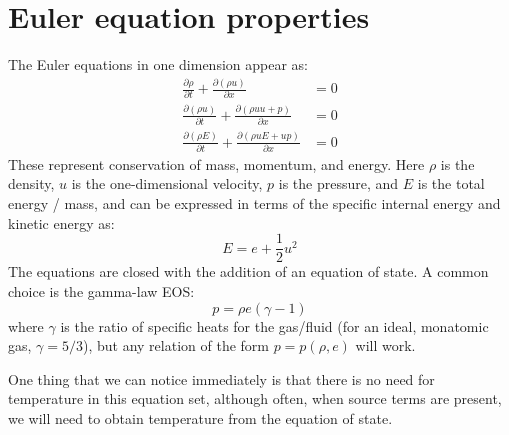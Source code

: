 \label{ch:compressible}

\begin{quote}
\end{quote}

\section{Euler equation properties}

The Euler equations in one dimension appear as:
\begin{align}
\frac{\partial \rho}{\partial t} + 
    \frac{\partial (\rho u)}{\partial x} &= 0 \\
%
\frac{\partial(\rho u)}{\partial t} +
    \frac{\partial (\rho uu + p)}{\partial x} &= 0 \\
%
\frac{\partial(\rho E)}{\partial t} + 
    \frac{\partial(\rho u E + u p)}{\partial x} &= 0
\end{align}
These represent conservation of mass, momentum, and energy.  Here $\rho$ is the
density, $u$ is the one-dimensional velocity, $p$ is the pressure, and $E$
is the total energy / mass, and can be expressed in terms of the
specific internal energy and kinetic energy as:
\begin{equation}
E = e + \frac{1}{2} u^2
\end{equation}
The equations are closed with the addition of an equation of state.  A common
choice is the gamma-law EOS:
\begin{equation}
p = \rho e(\gamma - 1)
\end{equation}
where $\gamma$ is the ratio of specific heats for the gas/fluid (for
an ideal, monatomic gas, $\gamma = 5/3$), but any relation of the form
$p = p(\rho, e)$ will work.  

One thing that we can notice immediately is that there is no need for
temperature in this equation set, although often, when source terms
are present, we will need to obtain temperature from the equation of
state.

